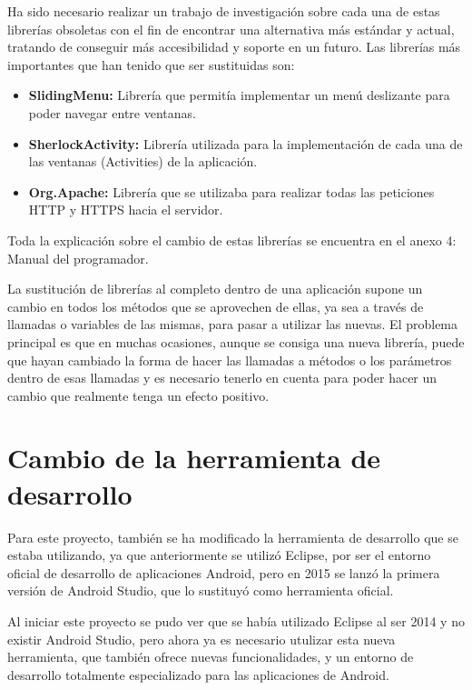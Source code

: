 Ha sido necesario realizar un trabajo de investigación sobre cada una de estas librerías obsoletas con el fin de encontrar una alternativa más estándar y actual, tratando de conseguir más accesibilidad y soporte en un futuro. Las librerías más importantes que han tenido que ser sustituidas son:

\begin{itemize}
\item \textbf{SlidingMenu:} Librería que permitía implementar un menú deslizante para poder navegar entre ventanas.
\item \textbf{SherlockActivity:} Librería utilizada para la implementación de cada una de las ventanas (Activities) de la aplicación.
\item \textbf{Org.Apache:} Librería que se utilizaba para realizar todas las peticiones HTTP y HTTPS hacia el servidor.
\end{itemize}

Toda la explicación sobre el cambio de estas librerías se encuentra en el anexo 4: Manual del programador.

La sustitución de librerías al completo dentro de una aplicación supone un cambio en todos los métodos que se aprovechen de ellas, ya sea a través de llamadas o variables de las mismas, para pasar a utilizar las nuevas. El problema principal es que en muchas ocasiones, aunque se consiga una nueva librería, puede que hayan cambiado la forma de hacer las llamadas a métodos o los parámetros dentro de esas llamadas y es necesario tenerlo en cuenta para poder hacer un cambio que realmente tenga un efecto positivo.

\section{Cambio de la herramienta de desarrollo}

Para este proyecto, también se ha modificado la herramienta de desarrollo que se estaba utilizando, ya que anteriormente se utilizó Eclipse, por ser el entorno oficial de desarrollo de aplicaciones Android, pero en 2015 se lanzó la primera versión de Android Studio, que lo sustituyó como herramienta oficial.

Al iniciar este proyecto se pudo ver que se había utilizado Eclipse al ser 2014 y no existir Android Studio, pero ahora ya es necesario utulizar esta nueva herramienta, que también ofrece nuevas funcionalidades, y un entorno de desarrollo totalmente especializado para las aplicaciones de Android. 

